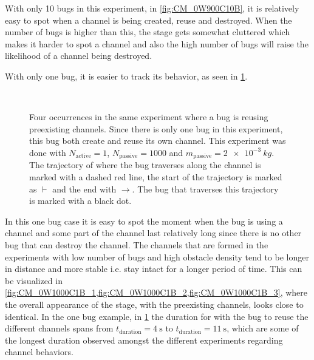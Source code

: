 With only 10 bugs in this experiment, in \cref{fig:CM_0W900C10B}, it is relatively easy to spot when a channel is 
being created, reuse and destroyed. When the number of bugs is higher than this, the 
stage gets somewhat cluttered which makes it harder to spot a channel and also the 
high number of bugs will raise the likelihood of a channel being destroyed.

With only one bug, it is easier to track its behavior, as seen in \cref{fig:CM_0W1000C1B}.

\begin{figure}[htpb!]
\centering
{}\quad
{}\\
\quad
{}
\caption{Four occurrences in the same experiment where a bug is reusing preexisting channels. 
Since there is only one bug in this experiment, this bug both create and reuse its own channel.
This experiment was done with $N_{\text{active}}=1$, $N_{\text{passive}}=1000$ and 
$m_{\text{passive}}=\SI{2e-3}{kg}$. The trajectory of where the bug traverses along the 
channel is marked with a dashed red line, the start of the trajectory is marked as $\vdash$ and the 
end with $\rightarrow$. The bug that traverses this trajectory is marked with a black dot.} 
\label{fig:CM_0W1000C1B}
\end{figure}

In this one bug case it is easy to spot the moment when the bug is using a channel and 
some part of the channel last relatively long since there is no other bug that can 
destroy the channel. The channels that are formed in the experiments with low 
number of bugs and high obstacle density tend to be longer in distance and more 
stable i.e. stay intact for a longer period of time. This can be visualized 
in \cref{fig:CM_0W1000C1B_1,fig:CM_0W1000C1B_2,fig:CM_0W1000C1B_3}, where 
the overall appearance of the stage, with the preexisting channels, looks 
close to identical. In the one bug example, in \cref{fig:CM_0W1000C1B} the duration 
for with the bug to reuse the different channels spans from $t_{\text{duration}}=\SI{4}{\second}$ 
to $t_{\text{duration}}=\SI{11}{\second}$, which are some of the longest duration observed 
amongst the different experiments regarding channel behaviors.

